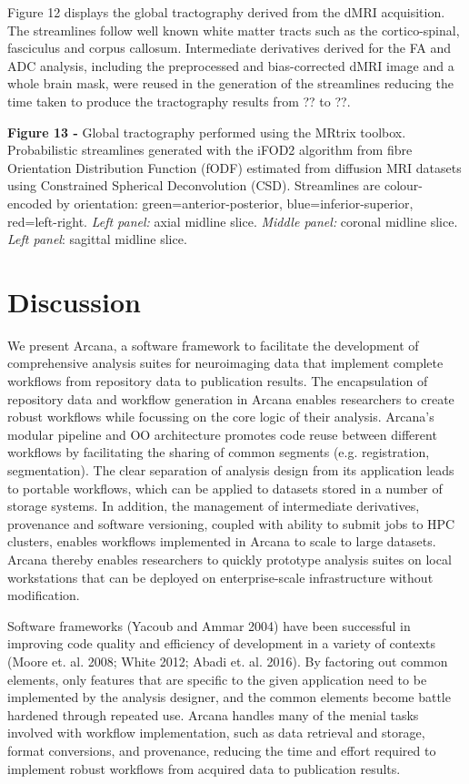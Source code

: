Figure 12 displays the global tractography derived from the dMRI
acquisition. The streamlines follow well known white matter tracts such
as the cortico-spinal, fasciculus and corpus callosum. Intermediate
derivatives derived for the FA and ADC analysis, including the
preprocessed and bias-corrected dMRI image and a whole brain mask, were
reused in the generation of the streamlines reducing the time taken to
produce the tractography results from ?? to ??.


\textbf{Figure 13 -} Global tractography performed using the MRtrix
toolbox. Probabilistic streamlines generated with the iFOD2 algorithm
from fibre Orientation Distribution Function (fODF) estimated from
diffusion MRI datasets using Constrained Spherical Deconvolution (CSD).
Streamlines are colour-encoded by orientation: green=anterior-posterior,
blue=inferior-superior, red=left-right. \emph{Left panel:} axial midline
slice. \emph{Middle panel:} coronal midline slice. \emph{Left panel}:
sagittal midline slice.

\section{Discussion}
\label{discussion}

We present Arcana, a software framework to facilitate the development of
comprehensive analysis suites for neuroimaging data that implement
complete workflows from repository data to publication results. The
encapsulation of repository data and workflow generation in Arcana
enables researchers to create robust workflows while focussing on the
core logic of their analysis. Arcana's modular pipeline and OO
architecture promotes code reuse between different workflows by
facilitating the sharing of common segments (e.g. registration,
segmentation). The clear separation of analysis design from its
application leads to portable workflows, which can be applied to
datasets stored in a number of storage systems. In addition, the
management of intermediate derivatives, provenance and software
versioning, coupled with ability to submit jobs to HPC clusters, enables
workflows implemented in Arcana to scale to large datasets. Arcana
thereby enables researchers to quickly prototype analysis suites on
local workstations that can be deployed on enterprise-scale
infrastructure without modification.

Software frameworks (Yacoub and Ammar 2004) have been successful in
improving code quality and efficiency of development in a variety of
contexts (Moore et. al. 2008; White 2012; Abadi et. al. 2016). By
factoring out common elements, only features that are specific to the
given application need to be implemented by the analysis designer, and
the common elements become battle hardened through repeated use. Arcana
handles many of the menial tasks involved with workflow implementation,
such as data retrieval and storage, format conversions, and provenance,
reducing the time and effort required to implement robust workflows from
acquired data to publication results.

